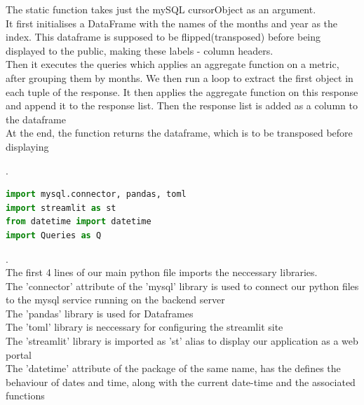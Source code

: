 \documentclass[12pt, a4paper]{article}
\begin{document}
The static function takes just the mySQL cursorObject as an argument.\\

It first initialises a DataFrame with the names of the months and year as the index. This dataframe is supposed to be flipped(transposed) before being displayed to the public, making these labels - column headers.\\

Then it executes the queries which applies an aggregate function on a metric, after grouping them by months. We then run a loop to extract the first object in each tuple of the response. It then applies the aggregate function on this response and append it to the response list. Then the response list is added as a column to the dataframe\\

At the end, the function returns the dataframe, which is to be transposed before displaying

\newpage
.\\

\begin{lstlisting}[language=Python, breaklines=true]
import mysql.connector, pandas, toml
import streamlit as st
from datetime import datetime
import Queries as Q
\end{lstlisting}
.\\

The first 4 lines of our main python file imports the neccessary libraries.\\

The 'connector' attribute of the 'mysql' library is used to connect our python files to the mysql service running on the backend server\\

The 'pandas' library is used for Dataframes\\

The 'toml' library is neccessary for configuring the streamlit site\\

The 'streamlit' library is imported as 'st' alias to display our application as a web portal\\

The 'datetime' attribute of the package of the same name, has the defines the behaviour of dates and time, along with the current date-time and the associated functions\\
\end{document}
